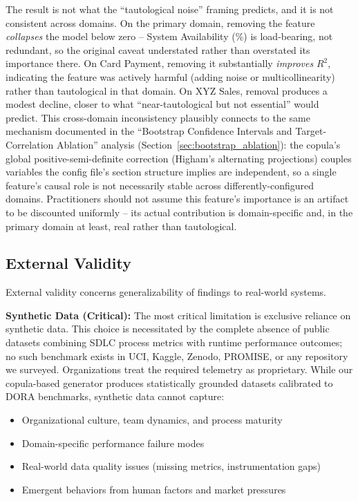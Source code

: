 \documentclass[technologies,article,submit,pdftex,moreauthors]{Definitions/mdpi}
\begin{document}
The result is not what the ``tautological noise'' framing predicts, and
it is not consistent across domains. On the primary domain, removing the
feature \emph{collapses} the model below zero -- System Availability
(\%) is load-bearing, not redundant, so the original caveat understated
rather than overstated its importance there. On Card Payment, removing
it substantially \emph{improves} \(R^2\), indicating the feature was
actively harmful (adding noise or multicollinearity) rather than
tautological in that domain. On XYZ Sales, removal produces a modest
decline, closer to what ``near-tautological but not essential'' would
predict. This cross-domain inconsistency plausibly connects to the same
mechanism documented in the ``Bootstrap Confidence Intervals and
Target-Correlation Ablation'' analysis (Section~\ref{sec:bootstrap_ablation}): the copula's
global positive-semi-definite correction (Higham's alternating
projections) couples variables the config file's section structure
implies are independent, so a single feature's causal role is not
necessarily stable across differently-configured domains. Practitioners
should not assume this feature's importance is an artifact to be
discounted uniformly -- its actual contribution is domain-specific and,
in the primary domain at least, real rather than tautological.

\subsection{External Validity}\label{sec:external_validity}

External validity concerns generalizability of findings to real-world
systems.

\textbf{Synthetic Data (Critical):} The most critical limitation is
exclusive reliance on synthetic data. This choice is necessitated by the
complete absence of public datasets combining SDLC process metrics with
runtime performance outcomes; no such benchmark exists in UCI, Kaggle,
Zenodo, PROMISE, or any repository we surveyed. Organizations treat the
required telemetry as proprietary. While our copula-based generator
produces statistically grounded datasets calibrated to DORA benchmarks,
synthetic data cannot capture:

\begin{itemize}
\item
  Organizational culture, team dynamics, and process maturity
\item
  Domain-specific performance failure modes
\item
  Real-world data quality issues (missing metrics, instrumentation gaps)
\item
  Emergent behaviors from human factors and market pressures
\end{itemize}
\end{document}
